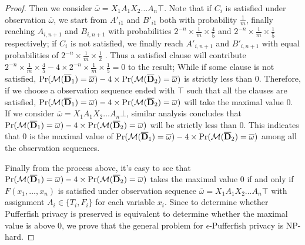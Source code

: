 \begin{proof}
  Then we consider $\overline{\omega}=X_1A_1X_2\ldots A_n \top$. Note that if $C_i$ is satisfied under observation $\overline{\omega}$, we start from $A'_{i1}$ and $B'_{i1}$ both with
  probability $\frac{1}{m}$, finally reaching $A_{i,n+1}$ and $B_{i,n+1}$ with probabilities $2^{-n} \times \frac{1}{m} \times \frac{4}{5}$
  and $2^{-n} \times \frac{1}{m} \times \frac{1}{5}$ respectively;
  if $C_i$ is not satisfied, we finally reach $A'_{i,n+1}$ and $B'_{i,n+1}$  with equal probabilities of $2^{-n}\times \frac{1}{m} \times \frac{1}{2}$ .
  Thus a satisfied clause will contribute $2^{-n} \times \frac{1}{m} \times \frac{4}{5} - 4 \times 2^{-n} \times \frac{1}{m} \times \frac{1}{5} = 0$ to
  the result; While if some clause is not satisfied, $\Pr (\mathcal{M} (\overline{\mathbf{D}}_1) = \overline{\omega})- 4\times \Pr (\mathcal{M} (\overline{\mathbf{D}}_2) = \overline{\omega})$ is strictly less than $0$.
  Therefore, if we choose a observation sequence ended with $\top$ such that all the
  clauses are satisfied, $\Pr (\mathcal{M} (\overline{\mathbf{D}}_1) = \overline{\omega})- 4\times \Pr (\mathcal{M} (\overline{\mathbf{D}}_2) = \overline{\omega})$ will take the maximal value 0.
  If we consider $\overline{\omega}=X_1A_1X_2\ldots A_n \bot$, similar analysis concludes that $\Pr (\mathcal{M} (\overline{\mathbf{D}}_1) = \overline{\omega}) - 4 \times \Pr (\mathcal{M} (\overline{\mathbf{D}}_2) = \overline{\omega})$
  will be strictly less than $0$.
  This indicates that $0$ is the maximal value of $\Pr (\mathcal{M} (\overline{\mathbf{D}}_1) = \overline{\omega}) - 4 \times \Pr (\mathcal{M} (\overline{\mathbf{D}}_2) = \overline{\omega})$
  among all the observation sequences.

  Finally from the process above, it's easy to see that
  $\Pr (\mathcal{M} (\overline{\mathbf{D}}_1) = \overline{\omega}) - 4 \times \Pr (\mathcal{M} (\overline{\mathbf{D}}_2) = \overline{\omega})$ takes the maximal value $0$
  if and only if $F(x_1,\ldots,x_n)$ is satisfied under observation sequence $\overline{\omega}=X_1A_1X_2\ldots A_n \top$
  with assignment $A_i \in \{T_i,F_i\}$ for each variable $x_i$.
  Since to determine whether Pufferfish privacy is preserved
  is equivalent to determine whether the maximal value is above $0$,
  we prove that the general problem for $\epsilon$-Pufferfish privacy is NP-hard.

\end{proof} 